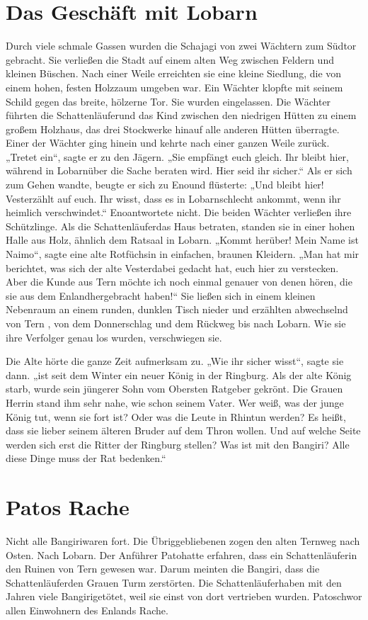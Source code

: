\documentclass[12pt,a4paper,onecolumn,twoside,ngerman]{book}
\newcommand{\Tern}{Tern }
\newcommand{\Bangiri}{Bangiri}
\newcommand{\Pato}{Pato}
\newcommand{\Enland}{Enland}
\newcommand{\Schattenjager}{Schattenläufer}
\newcommand{\Eno}{Eno}
\newcommand{\Lobarn}{Lobarn}
\newcommand{\Vester}{Vester}
\newcommand{\Naimo}{Naimo}
\newcommand{\Rhin}{Rhin}
\begin{document}
\section{Das Geschäft mit \Lobarn}
Durch viele schmale Gassen wurden die Schajagi von zwei Wächtern zum Südtor gebracht. Sie verließen die Stadt auf einem alten Weg zwischen Feldern und kleinen Büschen. Nach einer Weile erreichten sie eine kleine Siedlung, die von einem hohen, festen Holzzaum umgeben war. Ein Wächter klopfte mit seinem Schild gegen das breite, hölzerne Tor. Sie wurden eingelassen. Die Wächter führten die \Schattenjager und das Kind zwischen den niedrigen Hütten zu einem großem Holzhaus, das drei Stockwerke hinauf alle anderen Hütten überragte. Einer der Wächter ging hinein und kehrte nach einer ganzen Weile zurück.
„Tretet ein“, sagte er zu den Jägern. „Sie empfängt euch gleich. Ihr bleibt hier, während in \Lobarn über die Sache beraten wird. Hier seid ihr sicher.“ Als er sich zum Gehen wandte, beugte er sich zu \Eno und flüsterte: „Und bleibt hier! \Vester zählt auf euch. Ihr wisst, dass es in \Lobarn schlecht ankommt, wenn ihr heimlich verschwindet.“
\Eno antwortete nicht. Die beiden Wächter verließen ihre Schützlinge.
Als die \Schattenjager das Haus betraten, standen sie in einer hohen Halle aus Holz, ähnlich dem Ratsaal in \Lobarn.
„Kommt herüber! Mein Name ist \Naimo “, sagte eine alte Rotfüchsin in einfachen, braunen Kleidern. „Man hat mir berichtet, was sich der alte \Vester dabei gedacht hat, euch hier zu verstecken. Aber die Kunde aus \Tern möchte ich noch einmal genauer von denen hören, die sie aus dem \Enland hergebracht haben!“
Sie ließen sich in einem kleinen Nebenraum an einem runden, dunklen Tisch nieder und erzählten abwechselnd von \Tern, von dem Donnerschlag und dem Rückweg bis nach \Lobarn. Wie sie ihre Verfolger genau los wurden, verschwiegen sie.

Die Alte hörte die ganze Zeit aufmerksam zu.
„Wie ihr sicher wisst“, sagte sie dann. „ist seit dem Winter ein neuer König in der Ringburg. Als der alte König starb, wurde sein jüngerer Sohn vom Obersten Ratgeber gekrönt. Die Grauen Herrin stand ihm sehr nahe, wie schon seinem Vater. Wer weiß, was der junge König tut, wenn sie fort ist? Oder was die Leute in \Rhin tun werden? Es heißt, dass sie lieber seinem älteren Bruder auf dem Thron wollen. Und auf welche Seite werden sich erst die Ritter der Ringburg stellen? Was ist mit den \Bangiri? Alle diese Dinge muss der Rat bedenken.“  

\section{\Pato{s} Rache}
Nicht alle \Bangiri waren fort. Die Übriggebliebenen zogen den alten Ternweg nach Osten. Nach \Lobarn. Der Anführer \Pato hatte erfahren, dass ein \Schattenjager in den Ruinen von \Tern gewesen war. Darum meinten die \Bangiri{,} dass die \Schattenjager den Grauen Turm zerstörten. Die \Schattenjager haben mit den Jahren viele \Bangiri getötet, weil sie einst von dort vertrieben wurden. \Pato schwor allen Einwohnern des \Enland{s} Rache.
\end{document}
